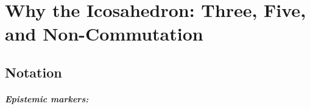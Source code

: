 
\providecommand{\BM}{\textbf{[B]}}
\providecommand{\KM}{\textbf{[K]}}
\providecommand{\SM}{\textbf{[S]}}
\providecommand{\EM}{\textbf{[E]}}

\chapter*{Why the Icosahedron: Three, Five, and Non-Commutation}

\begin{abstract}
FFGFT is a $\mathbb{Z}_3$ theory from the ground up. Yet the lepton masses
contain the golden ratio $\phi$, and $\phi$ is the number of five. This document
explains why the icosahedron is the bridge: its rotation group $A_5$ is the
smallest finite group in which a three and a five coexist without commuting.
From this non-commutation arises a mixing of the $\mathbb{Z}_3$ modes under the
five-fold rotation, and the mixing has one rational component $2/9$ and two
$\phi$-bearing components. The rational one is the Koide phase (Doc.~367), the
$\phi$-bearing ones are the skeleton of the mass ratios (Doc.~368). A single
matrix element of this mixing carries the entire Koide formula. The document
computes nothing new; it narrates what Docs.~285, 293, 367 and 368 mean together.
\end{abstract}

\section*{Notation}

\paragraph*{Epistemic markers:}\mbox{}\\[2pt]


